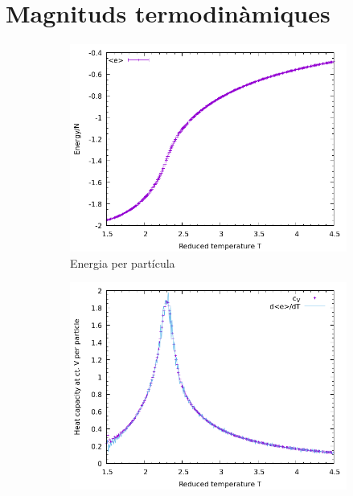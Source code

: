 \documentclass[a4paper]{article}
\begin{document}
\section{Magnituds termodinàmiques}

\begin{figure}[H]
    \centering
    \begin{subfigure}{.45\textwidth}
        \centering
        \includegraphics[width=\textwidth]{props-L-030_e.png}
        \caption{Energia per partícula}
        \label{fig:props-e}
    \end{subfigure}
    \begin{subfigure}{.45\textwidth}
        \centering
        \includegraphics[width=\textwidth]{props-L-030_cvn.png}

\end{subfigure}
\end{figure}
\end{document}
